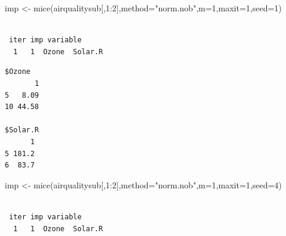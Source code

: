 \documentclass[
  letterpaper,
  DIV=11,
  numbers=noendperiod]{scrreprt}
\newenvironment{Shaded}{\begin{snugshade}}{\end{snugshade}}
\newcommand{\AttributeTok}[1]{\textcolor[rgb]{0.49,0.56,0.16}{#1}}
\newcommand{\DecValTok}[1]{\textcolor[rgb]{0.25,0.63,0.44}{#1}}
\newcommand{\FunctionTok}[1]{\textcolor[rgb]{0.02,0.16,0.49}{#1}}
\newcommand{\NormalTok}[1]{\textcolor[rgb]{0.00,0.44,0.13}{#1}}
\newcommand{\OtherTok}[1]{\textcolor[rgb]{0.00,0.44,0.13}{#1}}
\newcommand{\SpecialCharTok}[1]{\textcolor[rgb]{0.25,0.44,0.63}{#1}}
\newcommand{\StringTok}[1]{\textcolor[rgb]{0.25,0.44,0.63}{#1}}
\begin{document}
\begin{Shaded}
\begin{Highlighting}[]
\NormalTok{  imp }\OtherTok{\textless{}{-}} \FunctionTok{mice}\NormalTok{(airqualitysub[,}\DecValTok{1}\SpecialCharTok{:}\DecValTok{2}\NormalTok{],}\AttributeTok{method=}\StringTok{"norm.nob"}\NormalTok{,}\AttributeTok{m=}\DecValTok{1}\NormalTok{,}\AttributeTok{maxit=}\DecValTok{1}\NormalTok{,}\AttributeTok{seed=}\DecValTok{1}\NormalTok{)}
\end{Highlighting}
\end{Shaded}

\begin{verbatim}

 iter imp variable
  1   1  Ozone  Solar.R
\end{verbatim}

\begin{Shaded}
\end{Shaded}

\begin{verbatim}
$Ozone
       1
5   8.09
10 44.58

$Solar.R
      1
5 181.2
6  83.7
\end{verbatim}

\begin{Shaded}
\begin{Highlighting}[]
\NormalTok{  imp }\OtherTok{\textless{}{-}} \FunctionTok{mice}\NormalTok{(airqualitysub[,}\DecValTok{1}\SpecialCharTok{:}\DecValTok{2}\NormalTok{],}\AttributeTok{method=}\StringTok{"norm.nob"}\NormalTok{,}\AttributeTok{m=}\DecValTok{1}\NormalTok{,}\AttributeTok{maxit=}\DecValTok{1}\NormalTok{,}\AttributeTok{seed=}\DecValTok{4}\NormalTok{)}
\end{Highlighting}
\end{Shaded}

\begin{verbatim}

 iter imp variable
  1   1  Ozone  Solar.R
\end{verbatim}

\begin{Shaded}
\end{Shaded}
\end{document}
